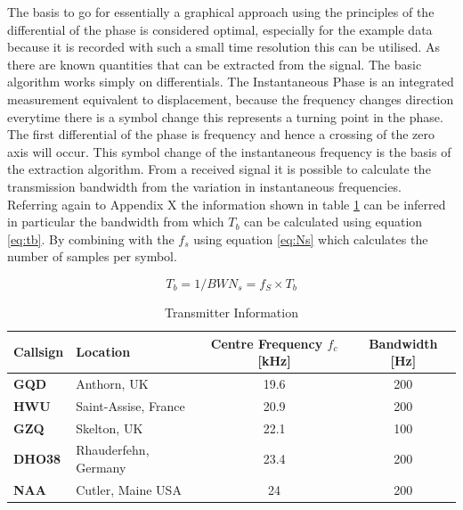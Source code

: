The basis to go for essentially a graphical approach using the principles of the differential of the phase is considered optimal, especially for the example data because it is recorded with such a small time resolution this can be utilised. As there are known quantities that can be extracted from the signal. The basic algorithm works simply on differentials. The Instantaneous Phase is an integrated measurement equivalent to displacement, because the frequency changes direction everytime there is a symbol change this represents a turning point in the phase. The first differential of the phase is frequency and hence a crossing of the zero axis will occur. This symbol change of the instantaneous frequency is the basis of the extraction algorithm. From a received signal it is possible to calculate the transmission bandwidth from the variation in instantaneous frequencies. Referring again to Appendix X the information shown in table \ref{tab:transinfo} can be inferred in particular the bandwidth from which $T_b$ can be calculated using equation \ref{eq:tb}. By combining with the $f_s$ using equation \ref{eq:Ns} which calculates the number of samples per symbol. 

\begin{subequations}
\begin{equation}
    T_b = 1/BW
    \label{eq:tb}
\end{equation}
\begin{equation}
    N_s = f_S \times T_b
    \label{eq:Ns}
\end{equation}
\end{subequations}

\begin{table}[h!]
    \centering
    \begin{tabular}{l|l|c|c}
    \textbf{Callsign} & \textbf{Location} & \textbf{Centre Frequency
    $f_c$}[kHz] & \textbf{Bandwidth} [Hz] \\
    \hline
    \textbf{GQD} & Anthorn, UK & 19.6 & 200 \\
    \textbf{HWU} & Saint-Assise, France & 20.9 & 200 \\
    \textbf{GZQ} & Skelton, UK & 22.1 & 100 \\
    \textbf{DHO38} & Rhauderfehn, Germany & 23.4 & 200 \\
    \textbf{NAA} & Cutler, Maine USA & 24 & 200 \\
    \end{tabular}
    \caption{Transmitter Information}
    \label{tab:transinfo}
\end{table}

